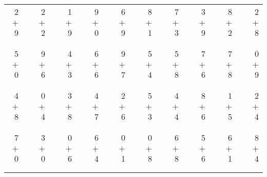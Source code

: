 \documentclass[12pt, letterpaper]{article}
\begin{document}
\begin{tabular}{rrrrrrrrrrrrrrrrrrr}
2 & & 2 & & 1 & & 9 & & 6 & & 8 & & 7 & & 3 & & 8 & & 2\\
$+$ 9 & & $+$ 2 & & $+$ 9 & & $+$ 0 & & $+$ 9 & & $+$ 1 & & $+$ 3 & & $+$ 9 & & $+$ 2 & & $+$ 8\\
\cline{1-1} \cline{3-3} \cline{5-5} \cline{7-7} \cline{9-9} \cline{11-11} \cline{13-13} \cline{15-15} \cline{17-17} \cline{19-19} \\ \\
5 & & 9 & & 4 & & 6 & & 9 & & 5 & & 5 & & 7 & & 7 & & 0\\
$+$ 0 & & $+$ 6 & & $+$ 3 & & $+$ 6 & & $+$ 7 & & $+$ 4 & & $+$ 8 & & $+$ 6 & & $+$ 8 & & $+$ 9\\
\cline{1-1} \cline{3-3} \cline{5-5} \cline{7-7} \cline{9-9} \cline{11-11} \cline{13-13} \cline{15-15} \cline{17-17} \cline{19-19} \\ \\
4 & & 0 & & 3 & & 4 & & 2 & & 5 & & 4 & & 8 & & 1 & & 2\\
$+$ 8 & & $+$ 4 & & $+$ 8 & & $+$ 7 & & $+$ 6 & & $+$ 3 & & $+$ 4 & & $+$ 6 & & $+$ 5 & & $+$ 4\\
\cline{1-1} \cline{3-3} \cline{5-5} \cline{7-7} \cline{9-9} \cline{11-11} \cline{13-13} \cline{15-15} \cline{17-17} \cline{19-19} \\ \\
7 & & 3 & & 0 & & 6 & & 0 & & 0 & & 6 & & 5 & & 6 & & 8\\
$+$ 0 & & $+$ 0 & & $+$ 6 & & $+$ 4 & & $+$ 1 & & $+$ 8 & & $+$ 8 & & $+$ 6 & & $+$ 1 & & $+$ 4\\
\cline{1-1} \cline{3-3} \cline{5-5} \cline{7-7} \cline{9-9} \cline{11-11} \cline{13-13} \cline{15-15} \cline{17-17} \cline{19-19} \\ \\
\end{tabular}
\newpage
\end{document}
